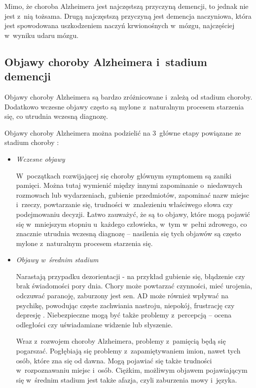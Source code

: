 {Mimo, że choroba Alzheimera jest najczęstszą przyczyną demencji, to jednak nie jest z~nią tożsama.
Drugą najczęstszą przyczyną jest demencja naczyniowa, która jest spowodowana uszkodzeniem naczyń krwionośnych w~mózgu, najczęściej w~wyniku udaru mózgu.


\subsection{Objawy choroby Alzheimera i~stadium demencji}

Objawy choroby Alzheimera są bardzo zróżnicowane i~zależą od stadium choroby.
Dodatkowo wczesne objawy często są mylone z~naturalnym procesem starzenia się, co utrudnia wczesną diagnozę.

Objawy choroby Alzheimera można podzielić na 3~główne etapy powiązane ze stadium choroby \cite{alzheimers-symptoms:2021}:

\begin{itemize}

  \item \emph{Wczesne objawy}

        W~początkach rozwijającej się choroby głównym symptomem są zaniki pamięci.
        Można tutaj wymienić między innymi zapominanie o~niedawnych rozmowach lub wydarzeniach, gubienie przedmiotów, zapominać nazw miejsc i~rzeczy, powtarzanie się, trudności w~znalezieniu właściwego słowa czy podejmowaniu decyzji.
        Łatwo zauważyć, że są to objawy, które mogą pojawić się w~mniejszym stopniu u~każdego człowieka, w~tym w~pełni zdrowego, co znacznie utrudnia wczesną diagnozę -- nasilenia się tych objawów są często mylone z~naturalnym procesem starzenia się.

  \item \emph{Objawy w~średnim stadium}

        Narastają przypadku dezorientacji - na przykład gubienie się, błądzenie czy brak świadomości pory dnia.
        Chory może powtarzać czynności, mieć urojenia, odczuwać paranoję, zaburzony jest sen.
        AD może również wpływać na psychikę, powodując częste zachwiania nastroju, niepokój, frustrację czy depresję \cite{li2014behavioral}.
        Niebezpieczne mogą być także problemy z~percepcją -- ocena odległości czy uświadamiane widzenie lub słyszenie.

        Wraz z~rozwojem choroby Alzheimera, problemy z~pamięcią będą się pogarszać.
        Pogłębiają się problemy z~zapamiętywaniem imion, nawet tych osób, które zna się od dawna.
        Mogą pojawiać się także trudności w~rozpoznawaniu miejsc i~osób.
        Ciężkim, możliwym objawem pojawiającym się w~średnim stadium jest także afazja, czyli zaburzenia mowy i~języka.


\end{itemize}}
